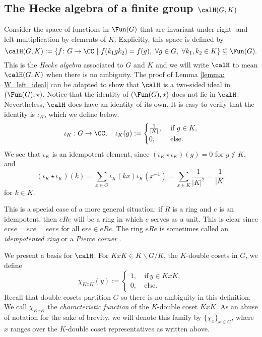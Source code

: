\subsection{The Hecke algebra of a finite group $\calH(G,K)$}\label{Section1.3}
Consider the space of functions in $\Fun(G)$ that are invariant under right- and left-multiplication by elements of $K$.
Explicitly, this space is defined by
\[
	\calH(G,K) := \{f\colon G\to \CC\ |\ f(k_1gk_2) = f(g),\ \forall g\in G,\ \forall k_1,k_2\in K\} \subseteq \Fun(G).
\]
This is the \emph{Hecke algebra} associated to $G$ and $K$ and we will write $\calH$ to mean $\calH(G,K)$ when there is no ambiguity.
The proof of Lemma \ref{lemma: W_left_ideal} can be adapted to show that $\calH$ is a two-sided ideal in $(\Fun(G),\star)$.
Notice that the identity of $(\Fun(G),\star)$ does not lie in $\calH$.
Nevertheless, $\calH$ does have an identity of its own.
It is easy to verify that the identity is $\iota_K$, which we define below.
\[
	\iota_K:G\to\CC,\quad \iota_K(g) := \begin{cases}
		\frac{1}{|K|},\  & \text{if}\ g\in K, \\
		0,\              & \text{else}.
	\end{cases}
\]
We see that $\iota_K$ is an idempotent element, since $(\iota_K\star\iota_K)(g)=0$ for $g\notin K$, and
\[
	(\iota_K\star\iota_K)(k) = \sum_{x\in G} \iota_K(kx)\iota_K(x^{-1}) = \sum_{x\in K} \frac{1}{|K|^2} = \frac{1}{|K|}
\]
for $k\in K$.

This is a special case of a more general situation: if $R$ is a ring and $e$ is an idempotent, then $eRe$ will be a ring in which $e$ serves as a unit.
This is clear since $eree=ere=eere$ for all $ere\in eRe$.
The ring $eRe$ is sometimes called an \emph{idempotented ring} or a \emph{Pierce corner} \cite{Bump10,Lam06}.

We present a basis for $\calH$.
For $KxK\in K\backslash G/K$, the $K$-double cosets in $G$, we define
\[
	\chi_{KxK}(y) := \begin{cases}
		1,\  & \text{if}\ y\in KxK, \\
		0,\  & \text{else}.
	\end{cases}
\]
Recall that double cosets partition $G$ so there is no ambiguity in this definition.
We call $\chi_{KxK}$ the \emph{characteristic function} of the $K$-double coset $KxK$.
As an abuse of notation for the sake of brevity, we will denote this family by $\{\chi_x\}_{x\in G}$, where $x$ ranges over the $K$-double coset representatives as written above.

